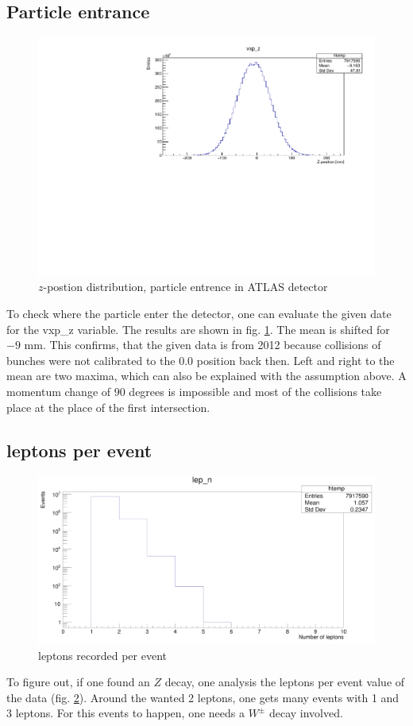 \documentclass[12pt, a4paper, bibliography=totoc]{scrreprt}
\begin{document}
\subsection{Particle entrance}
\begin{figure}[h]
	\centering
	\includegraphics[scale=0.5]{fig/vxp_z_redo.pdf}
	\caption{$z$-postion distribution, particle entrence in ATLAS detector}
	\label{vxp_z}
\end{figure}
To check where the particle enter the detector, one can evaluate the given date for the vxp\_z variable. 
The results are shown in fig. \ref{vxp_z}.
The mean is shifted for $-9$ \si{mm}. 
This confirms, that the given data is from 2012 because collisions of bunches were not calibrated to the $0.0$ position back then.
Left and right to the mean are two maxima, which can also be explained with the assumption above. 
A momentum change of $90$ degrees is impossible and most of the collisions take place at the place of the first intersection.

\subsection{leptons per event}
\begin{figure}[h]
	\centering
	\includegraphics[scale=0.15]{fig/number_produced_leptons.png}
	\caption{leptons recorded per event}
	\label{lep_n}
\end{figure}
To figure out, if one found an $Z$ decay, one analysis the leptons per event value of the data (fig. \ref{lep_n}).
Around the wanted 2 leptons, one gets many events with 1 and 3 leptons. For this events to happen, one needs a $W^{\pm}$ decay involved.
\end{document}
